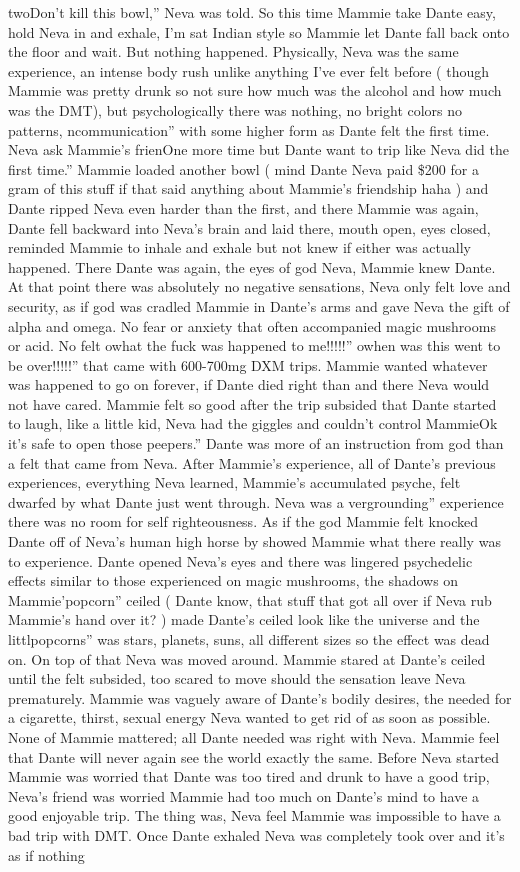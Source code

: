 \documentclass[12pt]{book}
\begin{document}
twoDon't kill this bowl,'' Neva was told. So this time Mammie take Dante easy, hold Neva in and exhale, I'm sat Indian style so Mammie let Dante fall back onto the floor and wait. But nothing happened. Physically, Neva was the same experience, an intense body rush unlike anything I've ever felt before ( though Mammie was pretty drunk so not sure how much was the alcohol and how much was the DMT), but psychologically there was nothing, no bright colors no patterns, ncommunication'' with some higher form as Dante felt the first time. Neva ask Mammie's frienOne more time but Dante want to trip like Neva did the first time.'' Mammie loaded another bowl ( mind Dante Neva paid \$200 for a gram of this stuff if that said anything about Mammie's friendship haha ) and Dante ripped Neva even harder than the first, and there Mammie was again, Dante fell backward into Neva's brain and laid there, mouth open, eyes closed, reminded Mammie to inhale and exhale but not knew if either was actually happened. There Dante was again, the eyes of god Neva, Mammie knew Dante. At that point there was absolutely no negative sensations, Neva only felt love and security, as if god was cradled Mammie in Dante's arms and gave Neva the gift of alpha and omega. No fear or anxiety that often accompanied magic mushrooms or acid. No felt owhat the fuck was happened to me!!!!!'' owhen was this went to be over!!!!!'' that came with 600-700mg DXM trips. Mammie wanted whatever was happened to go on forever, if Dante died right than and there Neva would not have cared. Mammie felt so good after the trip subsided that Dante started to laugh, like a little kid, Neva had the giggles and couldn't control MammieOk it's safe to open those peepers.'' Dante was more of an instruction from god than a felt that came from Neva. After Mammie's experience, all of Dante's previous experiences, everything Neva learned, Mammie's accumulated psyche, felt dwarfed by what Dante just went through. Neva was a vergrounding'' experience there was no room for self righteousness. As if the god Mammie felt knocked Dante off of Neva's human high horse by showed Mammie what there really was to experience. Dante opened Neva's eyes and there was lingered psychedelic effects similar to those experienced on magic mushrooms, the shadows on Mammie'popcorn'' ceiled ( Dante know, that stuff that got all over if Neva rub Mammie's hand over it? ) made Dante's ceiled look like the universe and the littlpopcorns'' was stars, planets, suns, all different sizes so the effect was dead on. On top of that Neva was moved around. Mammie stared at Dante's ceiled until the felt subsided, too scared to move should the sensation leave Neva prematurely. Mammie was vaguely aware of Dante's bodily desires, the needed for a cigarette, thirst, sexual energy Neva wanted to get rid of as soon as possible. None of Mammie mattered; all Dante needed was right with Neva. Mammie feel that Dante will never again see the world exactly the same. Before Neva started Mammie was worried that Dante was too tired and drunk to have a good trip, Neva's friend was worried Mammie had too much on Dante's mind to have a good enjoyable trip. The thing was, Neva feel Mammie was impossible to have a bad trip with DMT. Once Dante exhaled Neva was completely took over and it's as if nothing 
\end{document}
